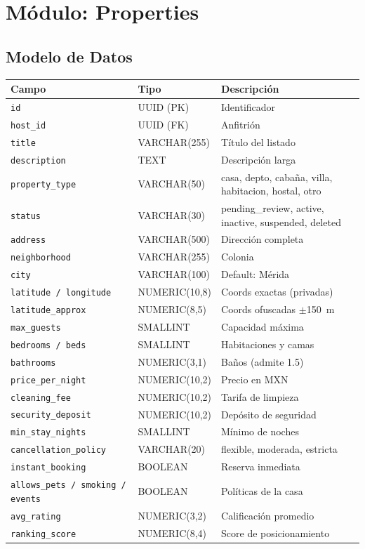 \documentclass[12pt,a4paper]{report}
\begin{document}
\section{M\'odulo: Properties}

\subsection{Modelo de Datos}

\begin{center}
\begin{tabularx}{\textwidth}{L{4.5cm} L{3cm} X}
\toprule
\textbf{Campo} & \textbf{Tipo} & \textbf{Descripci\'on} \\
\midrule
\texttt{id} & UUID (PK) & Identificador \\
\texttt{host\_id} & UUID (FK) & Anfitri\'on \\
\texttt{title} & VARCHAR(255) & T\'itulo del listado \\
\texttt{description} & TEXT & Descripci\'on larga \\
\texttt{property\_type} & VARCHAR(50) & casa, depto, caba\~na, villa, habitacion, hostal, otro \\
\texttt{status} & VARCHAR(30) & pending\_review, active, inactive, suspended, deleted \\
\texttt{address} & VARCHAR(500) & Direcci\'on completa \\
\texttt{neighborhood} & VARCHAR(255) & Colonia \\
\texttt{city} & VARCHAR(100) & Default: M\'erida \\
\texttt{latitude / longitude} & NUMERIC(10,8) & Coords exactas (privadas) \\
\texttt{latitude\_approx} & NUMERIC(8,5) & Coords ofuscadas $\pm$150~m \\
\texttt{max\_guests} & SMALLINT & Capacidad m\'axima \\
\texttt{bedrooms / beds} & SMALLINT & Habitaciones y camas \\
\texttt{bathrooms} & NUMERIC(3,1) & Ba\~nos (admite 1.5) \\
\texttt{price\_per\_night} & NUMERIC(10,2) & Precio en MXN \\
\texttt{cleaning\_fee} & NUMERIC(10,2) & Tarifa de limpieza \\
\texttt{security\_deposit} & NUMERIC(10,2) & Dep\'osito de seguridad \\
\texttt{min\_stay\_nights} & SMALLINT & M\'inimo de noches \\
\texttt{cancellation\_policy} & VARCHAR(20) & flexible, moderada, estricta \\
\texttt{instant\_booking} & BOOLEAN & Reserva inmediata \\
\texttt{allows\_pets / smoking / events} & BOOLEAN & Pol\'iticas de la casa \\
\texttt{avg\_rating} & NUMERIC(3,2) & Calificaci\'on promedio \\
\texttt{ranking\_score} & NUMERIC(8,4) & Score de posicionamiento \\
\bottomrule
\end{tabularx}
\end{center}
\end{document}
